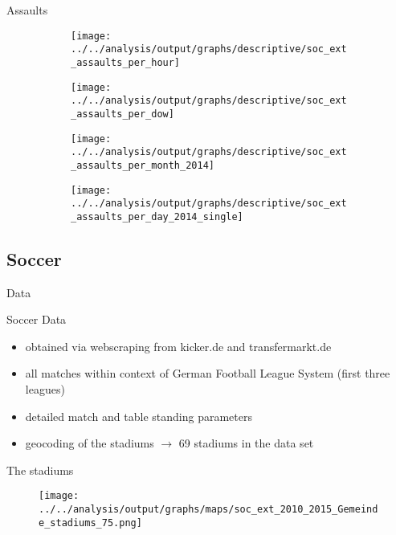 \documentclass[usenames,dvipsnames]{beamer} %
\begin{document}
	\begin{frame}{Assaults}
		\begin{figure}
			\begin{subfigure}[h]{0.48\linewidth}\centering
				\texttt{[image: ../../analysis/output/graphs/descriptive/soc\_ext\_assaults\_per\_hour]}
			\end{subfigure}
			\begin{subfigure}[h]{0.48\linewidth}\centering
				\texttt{[image: ../../analysis/output/graphs/descriptive/soc\_ext\_assaults\_per\_dow]}
			\end{subfigure}
			\begin{subfigure}[h]{0.48\linewidth}\centering
				\texttt{[image: ../../analysis/output/graphs/descriptive/soc\_ext\_assaults\_per\_month\_2014]}
			\end{subfigure}
			\begin{subfigure}[h]{0.48\linewidth}\centering
				\texttt{[image: ../../analysis/output/graphs/descriptive/soc\_ext\_assaults\_per\_day\_2014\_single]}
			\end{subfigure}
		\end{figure}
	\end{frame}


	\subsection{Soccer}
	\begin{frame}{Data}
		\begin{block}{Soccer Data}
			\begin{itemize}
				\item obtained via webscraping from kicker.de and transfermarkt.de
				\item all matches within context of German Football League System (first three leagues)
				\item detailed match and table standing parameters
				\item geocoding of the stadiums $\rightarrow$ 69 stadiums in the data set
			\end{itemize}
		\end{block}
	\end{frame}

	\begin{frame}{The stadiums}
		\begin{figure}
			\texttt{[image: ../../analysis/output/graphs/maps/soc\_ext\_2010\_2015\_Gemeinde\_stadiums\_75.png]}
		\end{figure}
	\end{frame}
\end{document}
